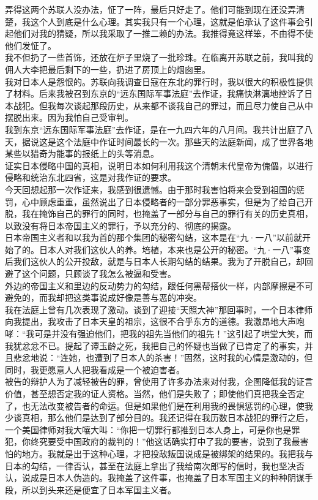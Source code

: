 弄得这两个苏联人没办法，怔了一阵，最后只好走了。他们可能到现在还没弄清楚，我这个人到底是什么心理。其实我只有一个心理，这就是伯承认了这件事会引起他们对我的猜疑，所以我采取了一推二赖的办法。我推得竟这样笨，不由得不使他们发怔了。\\

我不但扔了一些首饰，还放在炉子里烧了一批珍珠。在临离开苏联之前，我叫我的佣人大李把最后剩下的一些，扔进了房顶上的烟囱里。\\

我对日本人是怨恨的。苏联向我调查日寇在东北的罪行时，我以很大的积极性提供了材料。后来我被召到东京的“远东国际军事法庭”去作证，我痛快淋漓地控诉了日本战犯。但我每次谈起那段历史，从来都不谈我自己的罪过，而且尽力使自己从中摆脱出来。因为我怕自己受审判。\\

我到东京“远东国际军事法庭”去作证，是在一九四六年的八月间。我共计出庭了八天，据说这是这个法庭中作证时间最长的一次。那些天的法庭新闻，成了世界各地某些以猎奇为能事的报纸上的头等消息。\\

证实日本侵略中国的真相，说明日本如何利用我这个清朝末代皇帝为傀儡，以进行侵略和统治东北四省，这是对我作证的要求。\\

今天回想起那一次作证来，我感到很遗憾。由于那时我害怕将来会受到祖国的惩罚，心中顾虑重重，虽然说出了日本侵略者的一部分罪恶事实，但是为了给自己开脱，我在掩饰自己的罪行的同时，也掩盖了一部分与自己的罪行有关的历史真相，以致没有将日本帝国主义的罪行，予以充分的、彻底的揭露。\\

日本帝国主义者和以我为首的那个集团的秘密勾结，这本是在“九·一八”以前就开始了的。日本人对我们这伙人的养。培植，本来也是公开的秘密。“九·一八”事变后我们这伙人的公开投敌，就是与日本人长期勾结的结果。我为了开脱自己，却回避了这个问题，只顾谈了我怎么被逼和受害。\\

外边的帝国主义和里边的反动势力的勾结，跟任何黑帮搭伙一样，内部摩擦是不可避免的，而我却把这类事说成好像是善与恶的冲突。\\

我在法庭上曾有几次表现了激动。谈到了迎接“天照大神”那回事时，一个日本律师向我提出，我攻击了日本天皇的祖宗，这很不合乎东方的道德。我激昂地大声咆哮：“我可是并没有强迫他们，把我的祖先当他们的祖先！”这引起了哄堂大笑，而我犹忿忿不已。提起了谭玉龄之死，我把自己的怀疑也当做了已肯定了的事实，并且悲忿地说：“连她，也遭到了日本人的杀害！”固然，这时我的心情是激动的，但同时，我更愿意人人把我看成是一个被迫害者。\\

被告的辩护人为了减轻被告的罪，曾使用了许多办法来对付我，企图降低我的证言价值，甚至想否定我的证人资格。当然，他们是失败了；即使他们真把我全否定了，也无法改变被告者的命运。但是如果他们是在利用我的畏惧惩罚的心理，使我少谈真相，那么他们是达到了部分目的。我还记得在我历数日本战犯的罪行之后，一个美国律师对我大嚷大叫：“你把一切罪行都推到日本人身上，可是你也是罪犯，你终究要受中国政府的裁判的！”他这话确实打中了我的要害，说到了我最害怕的地方。我就是出于这种心理，才把投敌叛国说成是被绑架的结果的。我把我与日本的勾结，一律否认，甚至在法庭上拿出了我给南次郎写的信时，我也坚决否认，说成是日本人伪造的。我掩盖了这件事，也掩盖了日本军国主义的种种阴谋手段，所以到头来还是便宜了日本军国主义者。